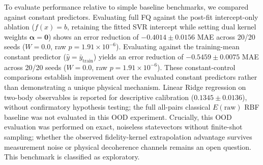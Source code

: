 \documentclass[conference]{IEEEtran}
\begin{document}
To evaluate performance relative to simple baseline benchmarks, we compared against constant predictors. Evaluating full FQ against the post-fit intercept-only ablation ($f(x) = b$, retaining the fitted SVR intercept while setting dual kernel weights $\boldsymbol{\alpha} = \mathbf{0}$) shows an error reduction of $-0.4014 \pm 0.0156$ MAE across 20/20 seeds ($W=0.0$, raw $p=1.91\times 10^{-6}$). Evaluating against the training-mean constant predictor ($\hat{y} = \bar{y}_{\mathrm{train}}$) yields an error reduction of $-0.5459 \pm 0.0075$ MAE across 20/20 seeds ($W=0.0$, raw $p=1.91\times 10^{-6}$). These constant-control comparisons establish improvement over the evaluated constant predictors rather than demonstrating a unique physical mechanism. Linear Ridge regression on two-body observables is reported for descriptive calibration ($0.1345 \pm 0.0136$), without confirmatory hypothesis testing; the full all-pairs classical $E(\text{raw})$ RBF baseline was not evaluated in this OOD experiment. Crucially, this OOD evaluation was performed on exact, noiseless statevectors without finite-shot sampling; whether the observed fidelity-kernel extrapolation advantage survives measurement noise or physical decoherence channels remains an open question. This benchmark is classified as exploratory.


\end{document}
